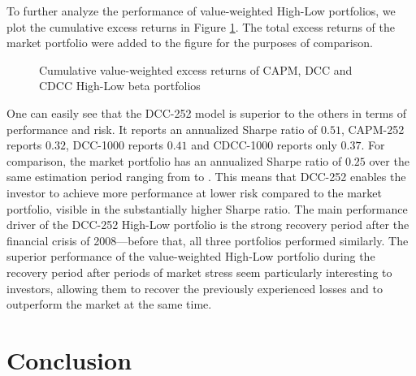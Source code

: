 \documentclass[11pt,a4paper]{article}
\begin{document}
To further analyze the performance of value-weighted High-Low portfolios, we plot the cumulative excess returns in Figure \ref{figure:vw_cum_ret_high-low}. The total excess returns of the market portfolio were added to the figure for the purposes of comparison.

\begin{figure}[H]
	\vspace{-12mm}
	\hspace{-5mm}\vspace{-15mm}
	\caption{Cumulative value-weighted excess returns of CAPM, DCC and CDCC High-Low beta portfolios}
	\label{figure:vw_cum_ret_high-low}
\end{figure}

One can easily see that the DCC-252 model is superior to the others in terms of performance and risk. It reports an annualized Sharpe ratio of $0.51$, CAPM-252 reports $0.32$, DCC-1000 reports $0.41$ and CDCC-1000 reports only $0.37$. For comparison, the market portfolio has an annualized Sharpe ratio of $0.25$ over the same estimation period ranging from \periodFrom{} to \periodTo{}. This means that DCC-252 enables the investor to achieve more performance at lower risk compared to the market portfolio, visible in the substantially higher Sharpe ratio. The main performance driver of the DCC-252 High-Low portfolio is the strong recovery period after the financial crisis of 2008---before that, all three portfolios performed similarly. The superior performance of the value-weighted High-Low portfolio during the recovery period after periods of market stress seem particularly interesting to investors, allowing them to recover the previously experienced losses and to outperform the market at the same time.






\newpage
\section{Conclusion}
\end{document}
